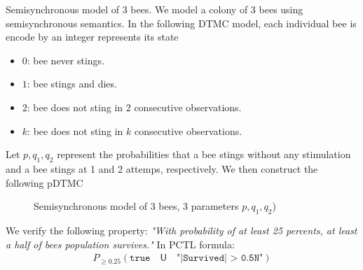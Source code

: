 \begin{example}{Semisynchronous model of 3 bees.}
    We model a colony of 3 bees using semisynchronous semantics. In the following DTMC model, each
    individual bee is encode by an integer represents its state
    \begin{itemize}
        \item $0$: bee never stings.
        \item $1$: bee stings and dies.
        \item $2$: bee does not sting in $2$ consecutive observations.
        \item $k$: bee does not sting in $k$ consecutive observations.
    \end{itemize}
    Let $p, q_1, q_2$ represent the probabilities that a bee stings without any stimulation and a
    bee stings at 1 and 2 attemps, respectively. We then construct the following pDTMC
    \begin{figure}[H]
        \centering
        \caption{Semisynchronous model of 3 bees, 3 parameters $p, q_1, q_2$)}
    \end{figure}
\end{example}
We verify the following property: \textit{"With probability of at least 25 percents, at least a half
    of bees population survives."} In PCTL formula:
\begin{align*}
    P_{\geq 0.25} ( \texttt{true} \quad \mathsf{U} \quad \texttt{"|Survived| > 0.5N"} )
\end{align*}

